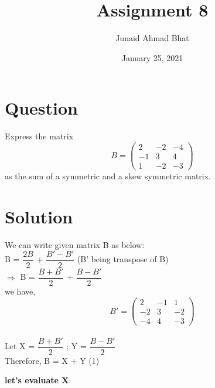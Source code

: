 \documentclass[a4paper,12pt]{article}
\begin{document}
\title{Assignment 8}
\author{Junaid Ahmad Bhat}
\date{January 25, 2021}
\maketitle

\section*{\small Question}
Express the matrix \begin{equation*}
B = 
\begin{pmatrix}
2 & -2 & -4 \\
-1 & 3 & 4 \\
1 & -2 & -3
\end{pmatrix}
\end{equation*}
as the sum of a symmetric and a skew symmetric matrix.\\

\section*{\small Solution}

We can write given matrix B as below:\\

\hspace*{0.5cm}  B = $\dfrac{2B}{2}$ + $\dfrac{B'-B'}{2}$     \hspace*{3cm}  (B' being transpose of B)\\

$\Rightarrow$ B = $\dfrac{B+B'}{2}$ + $\dfrac{B-B'}{2}$ \\

we have,
\begin{equation*}
B'=
\begin{pmatrix}
2 & -1 & 1 \\
-2 & 3 & -2 \\
-4 & 4 & -3
\end{pmatrix}
\end{equation*}\\

Let X =  $\dfrac{B+B'}{2}$ ; Y = $\dfrac{B-B'}{2}$\\

Therefore,
B = X + Y  \hspace*{3cm}(1)\\

\pagebreak

\textbf{let's evaluate X}:\\
\end{document}
